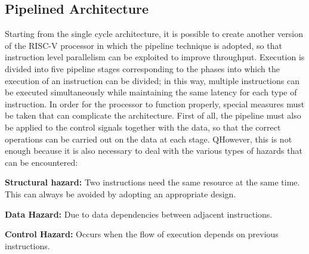 \subsection{Pipelined Architecture}
Starting from the single cycle architecture, it is possible to create another version of the RISC-V processor in which the pipeline technique is adopted, so that instruction level parallelism can be exploited to improve throughput.
Execution is divided into five pipeline stages corresponding to the phases into which the execution of an instruction can be divided; in this way, multiple instructions can be executed simultaneously while maintaining the same latency for each type of instruction.
In order for the processor to function properly, special measures must be taken that can complicate the architecture. First of all, the pipeline must also be applied to the control signals together with the data, so that the correct operations can be carried out on the data at each stage.
QHowever, this is not enough because it is also necessary to deal with the various types of hazards that can be encountered:
\begin{description}
\item \textbf{Structural hazard:} Two instructions need the same resource at the same time. This can always be avoided by adopting an appropriate design.

\item \textbf{Data Hazard:} Due to data dependencies between adjacent instructions.

\item \textbf{Control Hazard:} Occurs when the flow of execution depends on previous instructions.
\end{description}
